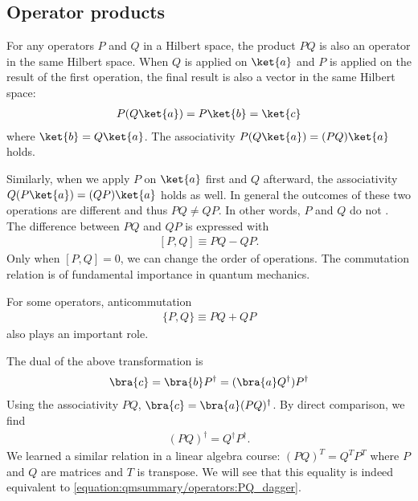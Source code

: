 \documentclass[letterpaper,10pt,english]{jupyterBook}
\begin{document}
\subsection{Operator products}
\label{\detokenize{qmsummary/operators:operator-products}}
\sphinxAtStartPar
For any operators \(P\) and \(Q\) in a Hilbert space, the product \(PQ\) is also an operator in the same Hilbert space. When \(Q\) is applied on \(\ket{a}\) and \(P\) is applied on the result of the first operation,  the final result is also a vector in the same Hilbert space:
\begin{equation*}
\begin{split}
P (Q\ket{a}) = P \ket{b} = \ket{c}
\end{split}
\end{equation*}
\sphinxAtStartPar
where \(\ket{b} = Q \ket{a}\). The associativity \(P (Q\ket{a}) = (PQ) \ket{a}\) holds.

\sphinxAtStartPar
Similarly, when we apply \(P\) on \(\ket{a}\) first and \(Q\) afterward, the associativity  \(Q (P\ket{a}) = (QP) \ket{a}\) holds as well.
In general the outcomes of these two operations are different and thus \(PQ \ne QP\).  In other words, \(P\) and \(Q\) do not .  The difference between \(PQ\) and \(QP\) is expressed with 
\begin{equation*}
\begin{split}
[P,Q] \equiv PQ - QP.
\end{split}
\end{equation*}
\sphinxAtStartPar
Only when \([P,Q]=0\), we can change the order of operations. The commutation relation is of fundamental importance in quantum mechanics.

\sphinxAtStartPar
For some operators, anti\sphinxhyphen{}commutation
\begin{equation*}
\begin{split}
\{P,Q\} \equiv PQ + QP
\end{split}
\end{equation*}
\sphinxAtStartPar
also plays an important role.

\sphinxAtStartPar
The dual of the above transformation is
\begin{equation*}
\begin{split}
\bra{c} = \bra{b}P^\dagger = (\bra{a} Q^\dagger) P^\dagger
\end{split}
\end{equation*}
\sphinxAtStartPar
Using the associativity \(PQ\), \(\bra{c} = \bra{a} (PQ)^\dagger\).  By direct comparison, we find
\begin{equation}\label{equation:qmsummary/operators:PQ_dagger}
\begin{split}
(PQ)^\dagger = Q^\dagger P^\dagger.
\end{split}
\end{equation}
\sphinxAtStartPar
We learned a similar relation in a linear algebra course: \((PQ)^T=Q^T P^T\) where \(P\) and \(Q\) are matrices and \(T\) is transpose.  We will see that this equality is indeed equivalent to \eqref{equation:qmsummary/operators:PQ_dagger}.
\end{document}
